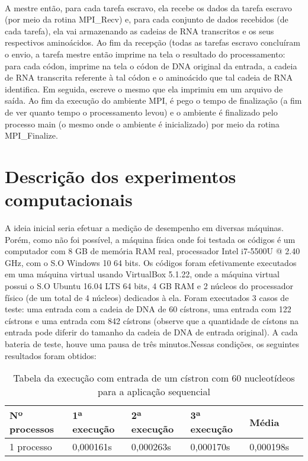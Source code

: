 \documentclass[a4paper,10pt]{article}
\begin{document}
\paragraph{} A mestre então, para cada tarefa escravo, ela recebe os dados da tarefa escravo (por meio da rotina MPI\_Recv) e, para cada conjunto de dados recebidos (de cada tarefa), ela vai armazenando as cadeias de RNA transcritos e os seus respectivos aminoácidos. Ao fim da recepção (todas as tarefas escravo concluíram o envio, a tarefa mestre então imprime na tela o resultado do processamento: para cada códon, imprime na tela o códon de DNA original da entrada, a cadeia de RNA transcrita referente à tal códon e o aminoácido que tal cadeia de RNA identifica. Em seguida, escreve o mesmo que ela imprimiu em um arquivo de saída. Ao fim da execução do ambiente MPI, é pego o tempo de finalização (a fim de ver quanto tempo o processamento levou) e o ambiente é finalizado pelo processo main (o mesmo onde o ambiente é inicializado) por meio da rotina MPI\_Finalize.\\

\newpage

\section{Descrição dos experimentos computacionais}
A ideia inicial seria efetuar a medição de desempenho em diversas máquinas. Porém, como não foi possível, a máquina física onde foi testada os códigos é um computador com 8 GB de memória RAM real, processador Intel i7-5500U @ 2.40 GHz, com o S.O Windows 10 64 bits. Os códigos foram efetivamente executados em uma máquina virtual usando VirtualBox 5.1.22, onde a máquina virtual possui o S.O Ubuntu 16.04 LTS 64 bits, 4 GB RAM e 2 núcleos do processador físico (de um total de 4 núcleos) dedicados à ela. Foram executados 3 casos de teste: uma entrada com a cadeia de DNA de 60 cístrons, uma entrada com 122 cístrons e uma entrada com 842 cístrons (observe que a quantidade de cístons na entrada pode diferir do tamanho da cadeia de DNA de  entrada original). A cada bateria de teste, houve uma pausa de três minutos.Nessas condições, os seguintes resultados foram obtidos:\\

\begin{table}[!htb]
\begin{tabular}{| l | l | l | l | l | p{5cm} |} 
\hline
  Nº processos & 1ª execução & 2ª execução & 3ª execução & Média\\ \hline
1 processo   &	0,000161s  &    0,000263s    & 0,000170s   &  0,000198s\\ \hline

\end{tabular}
\caption{Tabela da execução com entrada de um cístron com 60 nucleotídeos para a aplicação sequencial}
\end{table}
\end{document}
